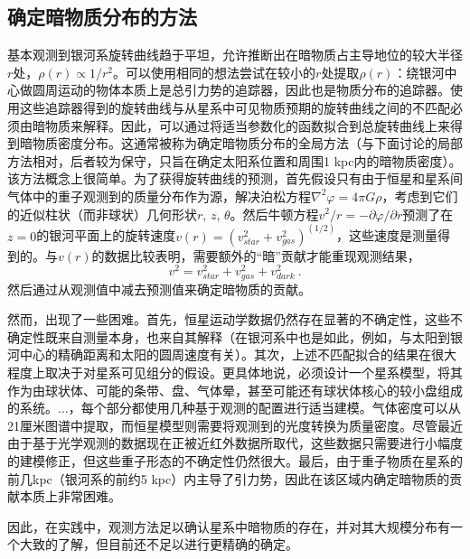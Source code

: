 \subsection{确定暗物质分布的方法} 

基本观测到银河系旋转曲线趋于平坦，允许推断出在暗物质占主导地位的较大半径$r$处，$\rho(r) \propto 1/r^2$。可以使用相同的想法尝试在较小的$r$处提取$\rho(r)$：绕银河中心做圆周运动的物体本质上是总引力势的追踪器，因此也是物质分布的追踪器。使用这些追踪器得到的旋转曲线与从星系中可见物质预期的旋转曲线之间的不匹配必须由暗物质来解释。因此，可以通过将适当参数化的函数拟合到总旋转曲线上来得到暗物质密度分布。这通常被称为确定暗物质分布的全局方法（与下面讨论的局部方法相对，后者较为保守，只旨在确定太阳系位置和周围1 kpc内的暗物质密度）。该方法概念上很简单。为了获得旋转曲线的预测，首先假设只有由于恒星和星系间气体中的重子观测到的质量分布作为源，解决泊松方程$\nabla^2 \varphi = 4 \pi G \rho$，考虑到它们的近似柱状（而非球状）几何形状$r$, $z$, $\theta$。然后牛顿方程$v^2/r = -\partial \varphi/\partial r$预测了在$z = 0$的银河平面上的旋转速度$v(r) = (v_{star}^2 + v_{gas}^2)^{(1/2)}$，这些速度是测量得到的。与$v(r)$的数据比较表明，需要额外的“暗”贡献才能重现观测结果，
\begin{equation}
v^2 = v_{star}^2 + v_{gas}^2 + v_{dark}^2~.
\end{equation}
然后通过从观测值中减去预测值来确定暗物质的贡献。

然而，出现了一些困难。首先，恒星运动学数据仍然存在显著的不确定性，这些不确定性既来自测量本身，也来自其解释（在银河系中也是如此，例如，与太阳到银河中心的精确距离和太阳的圆周速度有关）。其次，上述不匹配拟合的结果在很大程度上取决于对星系可见组分的假设。更具体地说，必须设计一个星系模型，将其作为由球状体、可能的条带、盘、气体晕，甚至可能还有球状体核心的较小盘组成的系统。...，每个部分都使用几种基于观测的配置进行适当建模。气体密度可以从21厘米图谱中提取，而恒星模型则需要将观测到的光度转换为质量密度。尽管最近由于基于光学观测的数据现在正被近红外数据所取代，这些数据只需要进行小幅度的建模修正，但这些重子形态的不确定性仍然很大。最后，由于重子物质在星系的前几kpc（银河系的前约5 kpc）内主导了引力势，因此在该区域内确定暗物质的贡献本质上非常困难。

因此，在实践中，观测方法足以确认星系中暗物质的存在，并对其大规模分布有一个大致的了解，但目前还不足以进行更精确的确定。 

